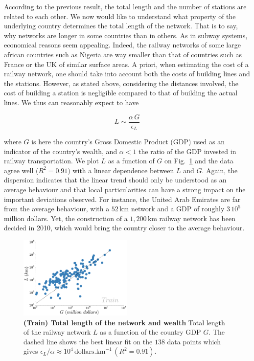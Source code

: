 According to the previous result, the total length and the number of stations
are related to each other. We now would like to understand what property of the
underlying country determines the total length of the network. That is to say,
why networks are longer in some countries than in others. As in subway systems,
economical reasons seem appealing. Indeed, the railway networks of some large
african countries such as Nigeria are way smaller than that of countries such as
France or the UK of similar surface areas. A priori, when estimating the cost of
a railway network, one should take into account both the costs of building lines
and the stations. However, as stated above, considering the distances involved,
the cost of building a station is negligible compared to that of building the
actual lines. We thus can reasonably expect to have

\begin{equation} 
    L \sim \frac{\alpha\,G}{\epsilon_L} 
\end{equation}

where $G$ is here the country's Gross Domestic Product (GDP) used as an
indicator of the country's wealth, and $\alpha < 1$ the ratio of the GDP
invested in railway transportation. We plot $L$ as a function of $G$ on
Fig.~\ref{fig:length-gdp} and the data agree well ($R^2 = 0.91$) with a linear
dependence between $L$ and $G$.  Again, the dispersion indicates
that the linear trend should only be understood as an average behaviour and that
local particularities can have a strong impact on the important deviations
observed.  For instance, the United Arab Emirates are far from the average
behaviour, with a $52\,\text{km}$ network and a GDP of roughly $3\,10^5$ million
dollars. Yet, the construction of a $1,200\,\text{km}$ railway network has been
decided in 2010, which would bring the country closer to the average behaviour. 

\begin{figure}
    \centering
    \includegraphics[width=0.5\textwidth]{gfx/chapter-networks/rail_length_gdp.pdf}
    \caption{{\bf(Train) Total length of the network and wealth} Total length of
the railway network $L$ as a function of the country GDP $G$. The dashed line
shows the best linear fit on the $138$ data points which gives $\epsilon_L /
\alpha \approx 10^4\, \text{dollars.km}^{-1}\,(R^2 =
0.91)$.\label{fig:length-gdp}} 
\end{figure}

